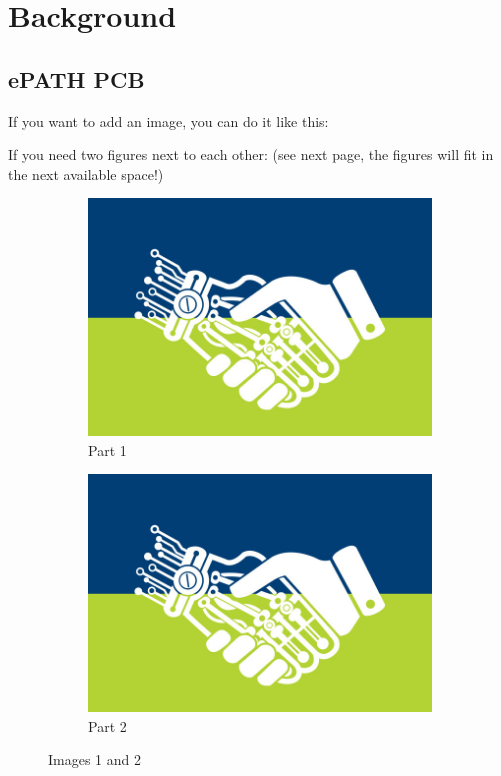 \section{Background}

\subsection{ePATH PCB}
\lipsum[1]

\noindent If you want to add an image, you can do it like this:



\noindent If you need two figures next to each other: (see next page, the figures will fit in the next available space!)
\begin{figure}
\begin{multicols}{2}
    \centering
        \begin{subfigure}[b]{0.475\textwidth}
            \centering
            \includegraphics[width=\textwidth]{img/bioeng.jpg}
            \caption{Part 1}    
        \end{subfigure}
        \hfill
        \begin{subfigure}[b]{0.475\textwidth}  
            \centering 
            \includegraphics[width=\textwidth]{img/bioeng.jpg}
            \caption{Part 2}    
        \end{subfigure}
\end{multicols}
    \caption{Images 1 and 2}
    \label{fig:2}
\end{figure}

